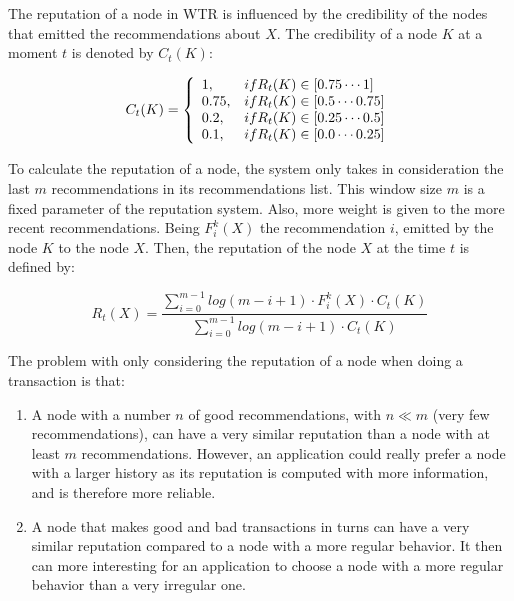 The reputation of a node in WTR is influenced by the credibility of the nodes
that emitted the recommendations about $X$. The credibility of a node $K$ at a
moment $t$ is denoted by $C_t (K)$:%

\begin{equation}
  C_t (K) = \left\{
  \begin{array}{l l}
    1, & if R_t(K) \in [0.75 \cdots 1]\\
    0.75, & if R_t(K) \in [0.5 \cdots 0.75]\\
    0.2,  & if R_t(K) \in [0.25 \cdots 0.5]\\
    0.1, & if R_t(K) \in [0.0 \cdots 0.25]\\
  \end{array}\right.
\end{equation}

To calculate the reputation of a node, the system only takes in consideration
the last $m$ recommendations in its recommendations list. This window size $m$ is
a fixed parameter of the reputation system. Also, more weight is given to the
more recent recommendations. 
Being $F_i^k (X)$ the recommendation $i$, emitted by the node $K$ to the node
$X$. Then, the reputation of the node $X$ at the time $t$ is defined by:

\begin{equation}
  R_t(X) = \frac{\sum_{i=0}^{m-1}  log(m-i+1) \cdot F_i^k(X) \cdot C_t(K)}{
\sum_{i=0}^{m-1} log(m-i+1) \cdot C_t(K)}
\end{equation}


The problem with only considering the reputation of a node when doing a
transaction is that:
\begin{enumerate}
  \item A node with a number $n$ of good recommendations, with $n \ll m$ (very
few recommendations), can have a very similar reputation than a node with at
least $m$ recommendations. However, an application could really prefer a node
with a larger history as its reputation is computed with more information, and
is therefore more reliable.
  \item A node that makes good and bad transactions in turns can have a very
similar reputation compared to a node with a more regular behavior. It then can
more interesting for an application to choose a node with a more regular
behavior than a very irregular one.

\end{enumerate}

